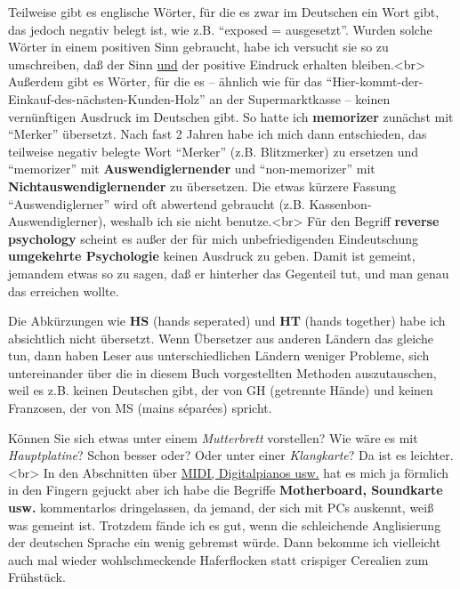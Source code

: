 Teilweise gibt es englische Wörter, für die es zwar im Deutschen ein Wort gibt, das jedoch negativ belegt ist, wie z.B. \enquote{exposed = ausgesetzt}.
Wurden solche Wörter in einem positiven Sinn gebraucht, habe ich versucht sie so zu umschreiben, daß der Sinn \underline{und} der positive Eindruck erhalten bleiben.<br>
\label{memorizer}
Außerdem gibt es Wörter, für die es -- ähnlich wie für das \enquote{Hier-kommt-der-Einkauf-des-nächsten-Kunden-Holz} an der Supermarktkasse -- keinen vernünftigen Ausdruck im Deutschen gibt.
So hatte ich \textbf{memorizer} zunächst mit \enquote{Merker} übersetzt. Nach fast 2 Jahren habe ich mich dann entschieden, das teilweise negativ belegte Wort \enquote{Merker} (z.B. Blitzmerker) zu ersetzen und \enquote{memorizer} mit \textbf{Auswendiglernender} und \enquote{non-memorizer} mit \textbf{Nichtauswendiglernender} zu übersetzen. Die etwas kürzere Fassung \enquote{Auswendiglerner} wird oft abwertend gebraucht (z.B. Kassenbon-Auswendiglerner), weshalb ich sie nicht benutze.<br>
\label{reversepsychology}
Für den Begriff \textbf{reverse psychology} scheint es außer der für mich unbefriedigenden Eindeutschung \textbf{umgekehrte Psychologie} keinen Ausdruck zu geben.
Damit ist gemeint, jemandem etwas so zu sagen, daß er hinterher das Gegenteil tut, und man genau das erreichen wollte.


\label{HsHt}

Die Abkürzungen wie \textbf{HS} (hands seperated) und \textbf{HT} (hands together) habe ich absichtlich nicht übersetzt.
Wenn Übersetzer aus anderen Ländern das gleiche tun, dann haben Leser aus unterschiedlichen Ländern weniger Probleme, sich untereinander über die in diesem Buch vorgestellten Methoden auszutauschen, weil es z.B. keinen Deutschen gibt, der von GH (getrennte Hände) und keinen Franzosen, der von MS (mains séparées) spricht.


\label{Motherboard}

Können Sie sich etwas unter einem \textit{Mutterbrett} vorstellen? Wie wäre es mit \textit{Hauptplatine}?
Schon besser oder?
Oder unter einer \textit{Klangkarte}? Da ist es leichter.<br>
In den Abschnitten über \hyperref[c1iii13MIDI]{MIDI, Digitalpianos usw.} hat es mich ja förmlich in den Fingern gejuckt aber ich habe die Begriffe \textbf{Motherboard, Soundkarte usw.} kommentarlos dringelassen, da jemand, der sich mit PCs auskennt, weiß was gemeint ist.
Trotzdem fände ich es gut, wenn die schleichende Anglisierung der deutschen Sprache ein wenig gebremst würde.
Dann bekomme ich vielleicht auch mal wieder wohlschmeckende Haferflocken statt crispiger Cerealien zum Frühstück.


